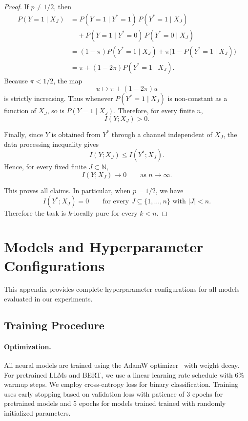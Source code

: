 \documentclass{article}
\theoremstyle{plain}
\theoremstyle{definition}
\theoremstyle{remark}
\begin{document}
\begin{proof}
If \(p\neq 1/2\), then
\begin{align*}
P(Y=1\mid X_J)
&=
P(Y=1\mid Y^*=1)\,P(Y^*=1\mid X_J) \\
&\quad +
P(Y=1\mid Y^*=0)\,P(Y^*=0\mid X_J) \\
&=
(1-\pi)P(Y^*=1\mid X_J)
+
\pi\bigl(1-P(Y^*=1\mid X_J)\bigr) \\
&=
\pi + (1-2\pi)P(Y^*=1\mid X_J).
\end{align*}
Because \(\pi<1/2\), the map
\[
u \mapsto \pi + (1-2\pi)u
\]
is strictly increasing. Thus whenever \(P(Y^*=1\mid X_J)\) is non-constant as a
function of \(X_J\), so is \(P(Y=1\mid X_J)\). Therefore, for every finite \(n\),
\[
I(Y;X_J)>0.
\]

Finally, since \(Y\) is obtained from \(Y^*\) through a channel independent of \(X_J\),
the data processing inequality gives
\[
I(Y;X_J)\le I(Y^*;X_J).
\]
Hence, for every fixed finite \(J\subset\mathbb N\),
\[
I(Y;X_J)\to 0
\qquad\text{as } n\to\infty.
\]

This proves all claims. In particular, when \(p=1/2\), we have
\[
I(Y^*;X_J)=0
\qquad
\text{for every } J\subseteq \{1,\ldots,n\}\text{ with } |J|<n.
\]
Therefore the task is \(k\)-locally pure for every \(k<n\).
\end{proof}

\section{Models and Hyperparameter Configurations}
\label{appendix:training}

This appendix provides complete hyperparameter configurations for all models evaluated in our experiments.

\subsection{Training Procedure}
\label{subsec:training}

\paragraph{Optimization.}
All neural models are trained using the AdamW optimizer~\citep{AdamW} with weight decay. For pretrained LLMs and BERT, we use a linear learning rate schedule with 6\% warmup steps. We employ cross-entropy loss for binary classification. Training uses early stopping based on validation loss with patience of 3 epochs for pretrained models and 5 epochs for models trained trained with randomly initialized parameters.
\end{document}
